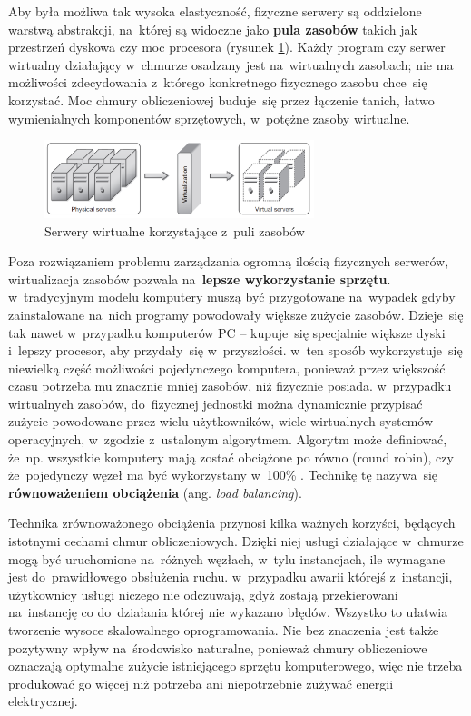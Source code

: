 \documentclass[12pt,a4paper,twoside,titlepage,openright]{book}
\begin{document}
Aby była możliwa tak wysoka elastyczność, fizyczne serwery są oddzielone warstwą abstrakcji, na~której są widoczne jako \textbf{pula zasobów} takich jak przestrzeń dyskowa czy moc procesora (rysunek \ref{fig:pooling}). Każdy program czy serwer wirtualny działający w~chmurze osadzany jest na~wirtualnych zasobach; nie ma możliwości zdecydowania z~którego konkretnego fizycznego zasobu chce~się korzystać. Moc chmury obliczeniowej buduje~się przez łączenie tanich, łatwo wymienialnych komponentów sprzętowych, w~potężne zasoby wirtualne. \cite{ccCambridge}

\begin{figure}[h]
	\centering
			\includegraphics[width=0.7\textwidth]{pooling.png}
		\caption{Serwery wirtualne korzystające z~puli zasobów \cite{ccCambridge}}
		\label{fig:pooling}
\end{figure}

Poza rozwiązaniem problemu zarządzania ogromną ilością fizycznych serwerów, wirtualizacja zasobów pozwala na~\textbf{lepsze wykorzystanie sprzętu}. w~tradycyjnym modelu komputery muszą być przygotowane na~wypadek gdyby zainstalowane na~nich programy powodowały większe zużycie zasobów. Dzieje~się tak nawet w~przypadku komputerów PC -- kupuje~się specjalnie większe dyski i~lepszy procesor, aby przydały~się w~przyszłości. w~ten sposób wykorzystuje~się niewielką część możliwości pojedynczego komputera, ponieważ przez większość czasu potrzeba mu znacznie mniej zasobów, niż fizycznie posiada. w~przypadku wirtualnych zasobów, do~fizycznej jednostki można dynamicznie przypisać zużycie powodowane przez wielu użytkowników, wiele wirtualnych systemów operacyjnych, w~zgodzie z~ustalonym algorytmem. Algorytm może definiować, że~np. wszystkie komputery mają zostać obciążone po równo (round robin), czy że~pojedynczy węzeł ma być wykorzystany w~100\% \cite{cloudFoundry}. Technikę tę nazywa~się \textbf{równoważeniem obciążenia} (ang. \textit{load balancing}).

Technika zrównoważonego obciążenia przynosi kilka ważnych korzyści, będących istotnymi cechami chmur obliczeniowych. Dzięki niej usługi działające w~chmurze mogą być uruchomione na~różnych węzłach, w~tylu instancjach, ile wymagane jest do~prawidłowego obsłużenia ruchu. w~przypadku awarii którejś z~instancji, użytkownicy usługi niczego nie odczuwają, gdyż zostają przekierowani na~instancję co do~działania której nie wykazano błędów. Wszystko to ułatwia tworzenie wysoce skalowalnego oprogramowania. Nie bez znaczenia jest także pozytywny wpływ na~środowisko naturalne, ponieważ chmury obliczeniowe oznaczają optymalne zużycie istniejącego sprzętu komputerowego, więc nie trzeba produkować go więcej niż potrzeba ani niepotrzebnie zużywać energii elektrycznej.
\end{document}

